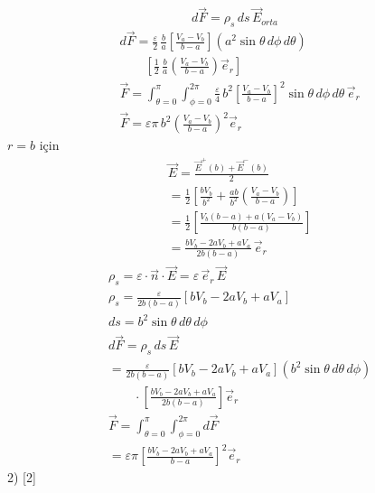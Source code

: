 \documentclass[11pt,a4paper]{article}
\begin{document}
\[ d\vec F=\rho_s\,ds\,\vec E_{orta} \]
\begin{align*}
&d\vec F=\frac{\varepsilon}{2}\,\frac ba\left[\frac{V_a-V_b}{b-a}\right]\left(a^2\sin\theta\,d\phi\,d\theta\right)\\
&\qquad\left[\frac12\,\frac ba\left(\frac{V_a-V_b}{b-a}\right)\vec e_r\right]\\
&\vec F=\int_{\theta=0}^{\pi}\int_{\phi=0}^{2\pi}\frac{\varepsilon}{4}\,b^2\left[\frac{V_a-V_b}{b-a}\right]^2\sin\theta\,d\phi\,d\theta\,\vec e_r\\
&\vec F=\varepsilon\pi\,b^2\left(\frac{V_a-V_b}{b-a}\right)^2\vec e_r
\end{align*}
$r=b$ için
\begin{align*}
&\vec E=\frac{\vec E^{+}(b)+\vec E^{-}(b)}{2}\\
&=\frac12\left[\frac{bV_b}{b^2}+\frac{ab}{b^2}\left(\frac{V_a-V_b}{b-a}\right)\right]\\
&=\frac12\left[\frac{V_b(b-a)+a(V_a-V_b)}{b(b-a)}\right]\\
&=\frac{bV_b-2aV_b+aV_a}{2b(b-a)}\,\vec e_r
\end{align*}
\begin{align*}
&\rho_s=\varepsilon\cdot\vec n\cdot\vec E=\varepsilon\,\vec e_r\,\vec E\\
&\rho_s=\frac{\varepsilon}{2b(b-a)}\left[bV_b-2aV_b+aV_a\right]\\
&ds=b^2\sin\theta\,d\theta\,d\phi\\
&d\vec F=\rho_s\,ds\,\vec E\\
&=\frac{\varepsilon}{2b(b-a)}\left[bV_b-2aV_b+aV_a\right]\left(b^2\sin\theta\,d\theta\,d\phi\right)\\
&\qquad\cdot\left[\frac{bV_b-2aV_b+aV_a}{2b(b-a)}\right]\vec e_r\\
&\vec F=\int_{\theta=0}^{\pi}\int_{\phi=0}^{2\pi}d\vec F\\
&=\varepsilon\pi\left[\frac{bV_b-2aV_b+aV_a}{b-a}\right]^2\vec e_r
\end{align*}
2)
[2]
\end{document}
